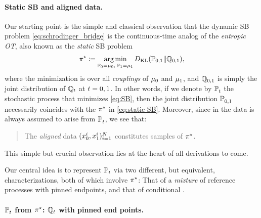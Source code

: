 \paragraph{Static SB and aligned data.}

Our starting point is the simple and classical observation that the dynamic \acrlong{SB} problem \eqref{eq:schrodinger_bridge} is the continuous-time analog of the \emph{entropic \acrlong{OT}}, also known as the \emph{static} \acrlong{SB} problem \citep{leonard2013survey,chen2021stochastic,peyre2019computational}
\begin{equation}
\label{eq:static-SB}
\Pssol \defeq \argmin_{ \substack{ \Pinit = \distinit, \; \Pend = \distend} } \KL( \mathbb{P}_{0,1} \| \refprobase_{0,1}),
\end{equation}
where the minimization is over all \emph{couplings} of $\distinit$ and $\distend$, and $\refprobase_{0,1}$ is simply the joint distribution of $\refpro$ at $t=0,\horizon$. In other words, if we denote by $\Psol$ the stochastic process that minimizes \eqref{eq:SB}, then the joint distribution $\Psol[0,\horizon]$ necessarily coincides with the $\Pssol$ in \eqref{eq:static-SB}. Moreover, since in  the data is always assumed to arise from $\Psol$, we see that:
\begin{quote}
The \emph{aligned} data $(\x_0^i,\x_1^i)_{i=1}^N$ constitutes samples of $\Pssol$.
\end{quote}
This simple but crucial observation lies at the heart of all derivations to come. 

Our central idea is to represent $\Psol$ via two different, but equivalent, characterizations, both of which involve $\Pssol$: That of a \emph{mixture} of reference processes with pinned endpoints, and that of conditional .

\paragraph{$\Psol$ from $\Pssol$: $\refpro$ with pinned end points.}

